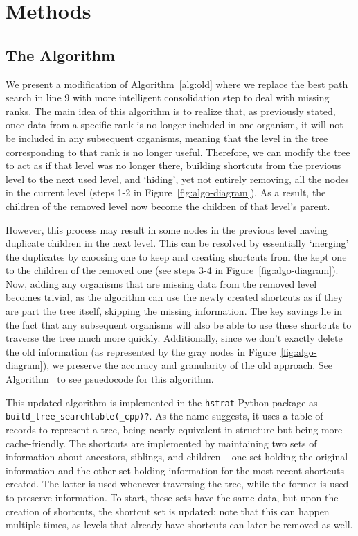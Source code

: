 \section{Methods} \label{sec:methods}

\subsection{The Algorithm} \label{sec:algorithm}

We present a modification of Algorithm~\ref{alg:old} where we replace the best path search in line 9 with more intelligent consolidation step to deal with missing ranks. The main idea of this algorithm is to realize that, as previously stated, once data from a specific rank is no longer included in one organism, it will not be included in any subsequent organisms, meaning that the level in the tree corresponding to that rank is no longer useful. Therefore, we can modify the tree to act as if that level was no longer there, building shortcuts from the previous level to the next used level, and `hiding', yet not entirely removing, all the nodes in the current level (steps 1-2 in Figure~\ref{fig:algo-diagram}). As a result, the children of the removed level now become the children of that level's parent. 



However, this process may result in some nodes in the previous level having duplicate children in the next level. This can be resolved by essentially `merging' the duplicates by choosing one to keep and creating shortcuts from the kept one to the children of the removed one (see steps 3-4 in Figure~\ref{fig:algo-diagram}). Now, adding any organisms that are missing data from the removed level becomes trivial, as the algorithm can use the newly created shortcuts as if they are part the tree itself, skipping the missing information. The key savings lie in the fact that any subsequent organisms will also be able to use these shortcuts to traverse the tree much more quickly. Additionally, since we don't exactly delete the old information (as represented by the gray nodes in Figure~\ref{fig:algo-diagram}), we preserve the accuracy and granularity of the old approach. See Algorithm~ to see psuedocode for this algorithm.



This updated algorithm is implemented in the \texttt{hstrat} Python package \citep{moreno2024hstrat} as \texttt{build\_tree\_searchtable(\_cpp)?}. As the name suggests, it uses a table of records to represent a tree, being nearly equivalent in structure but being more cache-friendly. The shortcuts are implemented by maintaining two sets of information about ancestors, siblings, and children -- one set holding the original information and the other set holding information for the most recent shortcuts created. The latter is used whenever traversing the tree, while the former is used to preserve information. To start, these sets have the same data, but upon the creation of shortcuts, the shortcut set is updated; note that this can happen multiple times, as levels that already have shortcuts can later be removed as well.

